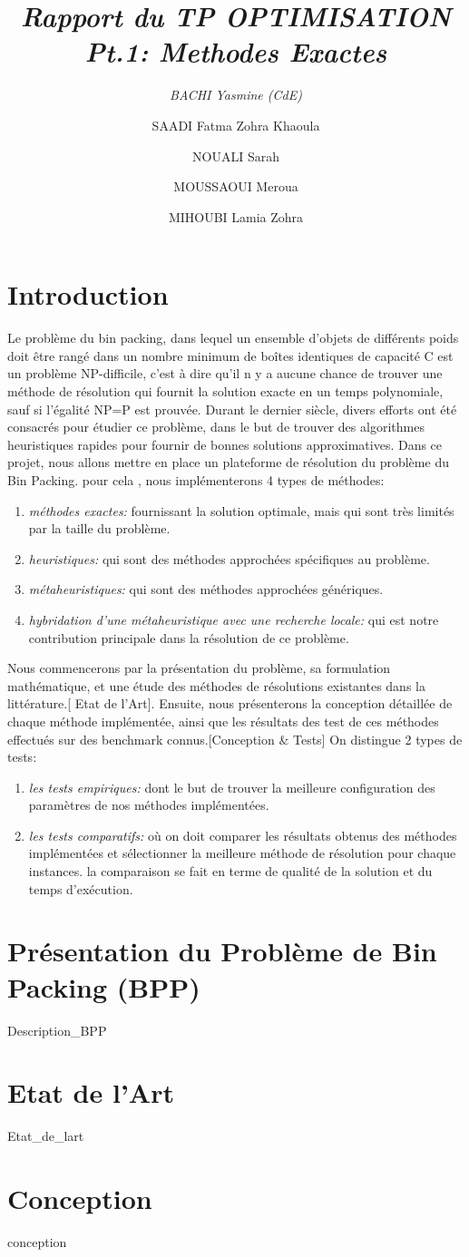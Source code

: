 \documentclass[12pt,a4paper, titlepage]{report}
\title{\emph{Rapport du TP OPTIMISATION Pt.1: Methodes Exactes} }
\author{ 
    \emph{BACHI Yasmine (CdE)}
    \and
    SAADI Fatma Zohra Khaoula
    \and 
    NOUALI Sarah
    \and 
    MOUSSAOUI Meroua
    \and 
    MIHOUBI Lamia Zohra}
\begin{document}
    \maketitle
    \tableofcontents
    \chapter*{Introduction}
      
    Le problème du bin packing, dans lequel un ensemble d’objets de différents poids doit être rangé dans un nombre minimum de boîtes identiques de capacité C est un problème NP-difficile, c’est à dire qu’il n y a aucune chance de trouver une méthode de résolution qui fournit la solution exacte en un temps polynomiale, sauf si l’égalité NP=P est prouvée. 
    Durant le dernier siècle, divers efforts ont été consacrés pour étudier ce problème, dans le but de trouver des algorithmes heuristiques rapides pour fournir de bonnes solutions approximatives.
    Dans ce projet, nous allons mettre en place un plateforme de résolution du problème du Bin Packing. pour cela , nous implémenterons 4 types de méthodes: 
    \begin{enumerate}
        \item \emph{méthodes exactes:} fournissant la solution optimale, mais qui sont très limités par la taille du problème. 
        \item \emph{heuristiques:} qui sont des méthodes approchées spécifiques au problème.
        \item \emph{métaheuristiques:} qui sont des méthodes approchées génériques.
        \item \emph{hybridation d'une métaheuristique avec une recherche locale:} qui est notre contribution principale dans la résolution de ce problème.
    \end{enumerate}
    Nous commencerons par la présentation du problème, sa formulation mathématique, et une étude des méthodes de résolutions existantes dans la littérature.[ Etat de l’Art]. Ensuite, nous présenterons la conception détaillée de chaque méthode implémentée, ainsi que les résultats des test de ces méthodes effectués sur des benchmark connus.[Conception \& Tests]
    On distingue 2 types de tests:
    \begin{enumerate}
        \item \emph{les tests empiriques:} dont le but de trouver la meilleure configuration des paramètres de nos méthodes implémentées.  
        \item \emph{les tests comparatifs:} où on doit comparer les résultats obtenus des méthodes implémentées et sélectionner la meilleure méthode de résolution pour chaque instances. la comparaison se fait en terme de qualité de la solution et du temps d'exécution. 
    \end{enumerate}
    \chapter{Présentation du Problème de Bin Packing (BPP)}
    {Description_BPP}
    \chapter{Etat de l'Art}
    {Etat_de_lart}
    \chapter{Conception}
    {conception}
\end{document}
